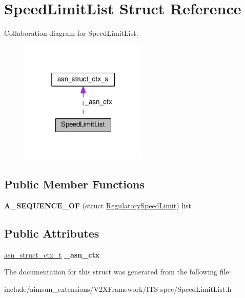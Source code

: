 \hypertarget{structSpeedLimitList}{}\section{Speed\+Limit\+List Struct Reference}
\label{structSpeedLimitList}


Collaboration diagram for Speed\+Limit\+List\+:\nopagebreak
\begin{figure}[H]
\begin{center}
\leavevmode
\includegraphics[width=172pt]{structSpeedLimitList__coll__graph}
\end{center}
\end{figure}
\subsection*{Public Member Functions}
\begin{DoxyCompactItemize}
\item 
{\bfseries A\+\_\+\+S\+E\+Q\+U\+E\+N\+C\+E\+\_\+\+OF} (struct \hyperlink{structRegulatorySpeedLimit}{Regulatory\+Speed\+Limit}) list\hypertarget{structSpeedLimitList_ad57c879f309e993703e0c9852242ec4a}{}\label{structSpeedLimitList_ad57c879f309e993703e0c9852242ec4a}

\end{DoxyCompactItemize}
\subsection*{Public Attributes}
\begin{DoxyCompactItemize}
\item 
\hyperlink{structasn__struct__ctx__s}{asn\+\_\+struct\+\_\+ctx\+\_\+t} {\bfseries \+\_\+asn\+\_\+ctx}\hypertarget{structSpeedLimitList_a7292c6b8680ba072a397b9b7109d525b}{}\label{structSpeedLimitList_a7292c6b8680ba072a397b9b7109d525b}

\end{DoxyCompactItemize}


The documentation for this struct was generated from the following file\+:\begin{DoxyCompactItemize}
\item 
include/aimsun\+\_\+extensions/\+V2\+X\+Framework/\+I\+T\+S-\/spec/Speed\+Limit\+List.\+h\end{DoxyCompactItemize}

